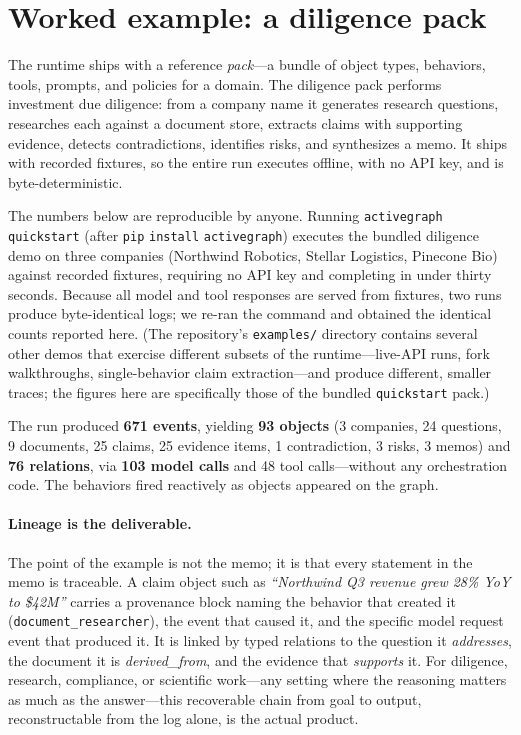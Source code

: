 \documentclass[11pt]{article}
\begin{document}
\section{Worked example: a diligence pack}
\label{sec:worked}

The runtime ships with a reference \emph{pack}---a bundle of object types,
behaviors, tools, prompts, and policies for a domain. The diligence pack performs
investment due diligence: from a company name it generates research questions,
researches each against a document store, extracts claims with supporting
evidence, detects contradictions, identifies risks, and synthesizes a memo. It
ships with recorded fixtures, so the entire run executes offline, with no API key,
and is byte-deterministic.

The numbers below are reproducible by anyone. Running \texttt{activegraph}
\texttt{quickstart} (after \texttt{pip} \texttt{install} \texttt{activegraph}) executes the
bundled diligence demo on three companies (Northwind Robotics, Stellar Logistics,
Pinecone Bio) against recorded fixtures, requiring no API key and completing in
under thirty seconds.
Because all model and tool responses are served from fixtures, two runs produce
byte-identical logs; we re-ran the command and obtained the identical counts
reported here. (The repository's \texttt{examples/} directory contains several
other demos that exercise different subsets of the runtime---live-API runs, fork
walkthroughs, single-behavior claim extraction---and produce different, smaller
traces; the figures here are specifically those of the bundled \texttt{quickstart}
pack.)

The run produced \textbf{671 events}, yielding \textbf{93 objects} (3 companies, 24
questions, 9 documents, 25 claims, 25 evidence items, 1 contradiction, 3 risks, 3
memos) and \textbf{76 relations}, via \textbf{103 model calls} and 48 tool
calls---without any orchestration code. The behaviors fired reactively as objects
appeared on the graph.

\paragraph{Lineage is the deliverable.}
The point of the example is not the memo; it is that every statement in the memo is
traceable. A claim object such as \emph{``Northwind Q3 revenue grew 28\% YoY to
\$42M''} carries a provenance block naming the behavior that created it
(\texttt{document\_researcher}), the event that caused it, and the specific model
request event that produced it. It is linked by typed relations to the question it
\emph{addresses}, the document it is \emph{derived\_from}, and the evidence that
\emph{supports} it. For diligence, research, compliance, or scientific work---any
setting where the reasoning matters as much as the answer---this recoverable chain
from goal to output, reconstructable from the log alone, is the actual product.
\end{document}
